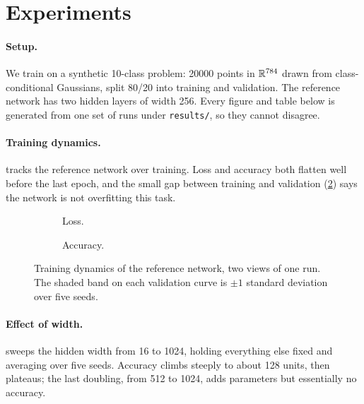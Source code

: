 \section{Experiments}
\label{sec:experiments}

\paragraph{Setup.}
We train on a synthetic \num{10}-class problem: \num{20000} points in
$\mathbb{R}^{784}$ drawn from class-conditional Gaussians, split \num{80}/\num{20} into
training and validation.
The reference network has two hidden layers of width \num{256}.
Every figure and table below is generated from one set of runs under
\texttt{results/}, so they cannot disagree.

\paragraph{Training dynamics.}
 tracks the reference network over training.
Loss and accuracy both flatten well before the last epoch, and the small gap
between training and validation (\cref{fig:acc}) says the network is not
overfitting this task.

\begin{figure}[t]
  \centering
  \begin{subfigure}{0.48\linewidth}
    \centering
    
    \caption{Loss.}
    \label{fig:loss}
  \end{subfigure}\hfill
  \begin{subfigure}{0.48\linewidth}
    \centering
    
    \caption{Accuracy.}
    \label{fig:acc}
  \end{subfigure}
  \caption{Training dynamics of the reference network, two views of one run. The
    shaded band on each validation curve is $\pm 1$ standard deviation over five
    seeds.}
  \label{fig:training}
\end{figure}

\paragraph{Effect of width.}
 sweeps the hidden width from \num{16} to \num{1024}, holding
everything else fixed and averaging over five seeds.
Accuracy climbs steeply to about \num{128} units, then plateaus; the last
doubling, from \num{512} to \num{1024}, adds parameters but essentially no
accuracy.

